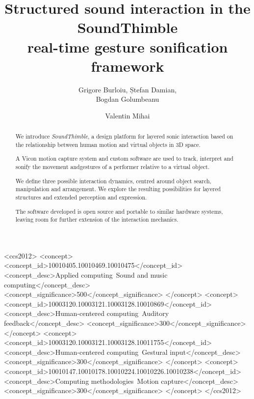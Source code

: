 \documentclass[sigchi, review]{acmart}
\begin{document}
\title{Structured sound interaction in the SoundThimble\\ real-time gesture sonification framework}

\author{Grigore Burloiu, Ștefan Damian,\\ Bogdan Golumbeanu}

\author{Valentin Mihai}


\begin{abstract}
We introduce \textit{SoundThimble}, a design platform for layered sonic interaction based on the relationship between human motion and virtual objects in 3D space.

A Vicon motion capture system and custom software are used to track, interpret and sonify the movement and\linebreak gestures of a performer relative to a virtual object.

We define three possible interaction dynamics, centred around object search, manipulation and arrangement. We explore the resulting possibilities for layered structures and extended perception and expression.

The software developed is open source and portable to similar hardware systems, leaving room for further extension of the interaction mechanics.
\end{abstract}

%
%
\begin{CCSXML}
 <ccs2012>
 <concept>
 <concept_id>10010405.10010469.10010475</concept_id>
 <concept_desc>Applied computing~Sound and music computing</concept_desc>
 <concept_significance>500</concept_significance>
 </concept>
 <concept>
 <concept_id>10003120.10003121.10003128.10010869</concept_id>
 <concept_desc>Human-centered computing~Auditory feedback</concept_desc>
 <concept_significance>300</concept_significance>
 </concept>
 <concept>
 <concept_id>10003120.10003121.10003128.10011755</concept_id>
 <concept_desc>Human-centered computing~Gestural input</concept_desc>
 <concept_significance>300</concept_significance>
 </concept>
 <concept>
 <concept_id>10010147.10010178.10010224.10010226.10010238</concept_id>
 <concept_desc>Computing methodologies~Motion capture</concept_desc>
 <concept_significance>300</concept_significance>
 </concept>
 </ccs2012>
\end{CCSXML}
\end{document}
